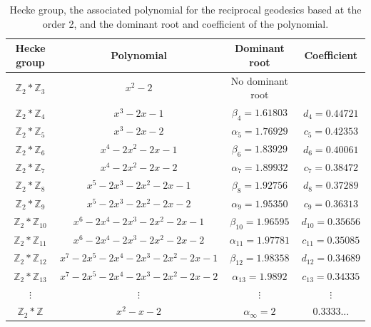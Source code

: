 \documentclass[11pt]{amsart}
\numberwithin{equation}{section}
\theoremstyle{plain}
\begin{document}
\begin{table}\label{ta: poly}
\begin{center}
\begin{tabular}{ |c|c|c|c| } 
 \hline
 Hecke group & Polynomial & Dominant root & Coefficient   \\ 
\hline
\hline
 $\mathbb{Z}_2\ast \mathbb{Z}_3$&$x^{2}-2$ & No dominant root& \\ 
\hline
 $\mathbb{Z}_2\ast \mathbb{Z}_4$&  $x^{3}-2x-1$& $\beta_{4}=1.61803$  & $d_{4}=0.44721$  \\ 
\hline
 $\mathbb{Z}_2\ast \mathbb{Z}_5$&$x^{3}-2x-2$&$\alpha_{5}=1.76929$ & $c_{5}=0.42353$  \\
\hline
 $\mathbb{Z}_2\ast \mathbb{Z}_6$&$x^{4}-2x^{2}-2x-1$ &$\beta_{6}=1.83929$  & $d_{6}=0.40061$  \\
\hline
 $\mathbb{Z}_2\ast \mathbb{Z}_7$&$x^{4}-2x^{2}-2x-2$& $\alpha_{7}=1.89932$ & $c_{7}=0.38472$  \\
\hline
 $\mathbb{Z}_2\ast \mathbb{Z}_8$&$x^{5}-2x^{3}-2x^{2}-2x-1$ &$\beta_{8}=1.92756$ & $d_{8}=0.37289$  \\
\hline
 $\mathbb{Z}_2\ast \mathbb{Z}_9$&$x^{5}-2x^{3}-2x^{2}-2x-2$ & $\alpha_9=1.95350$  & $c_{9}=0.36313$  \\
\hline 
 $\mathbb{Z}_2\ast \mathbb{Z}_{10}$&$x^{6}-2x^{4}-2x^{3}-2x^{2}-2x-1$&$\beta_{10}=1.96595$  & $d_{10}=0.35656$  \\
\hline
 $\mathbb{Z}_2\ast \mathbb{Z}_{11}$&$x^{6}-2x^{4}-2x^{3}-2x^{2}-2x-2$&$\alpha_{11}=1.97781$ & $c_{11}=0.35085$  \\
\hline 
 $\mathbb{Z}_2\ast \mathbb{Z}_{12}$&$x^{7}-2x^{5}-2x^{4}-2x^{3}-2x^{2}-2x-1$ &$\beta_{12}=1.98358$ & $d_{12}=0.34689$  \\
 \hline
  $\mathbb{Z}_2\ast \mathbb{Z}_{13}$&$x^{7}-2x^{5}-2x^{4}-2x^{3}-2x^{2}-2x-2$ &$\alpha_{13}=1.9892$ & $c_{13}=0.34335$  \\
 \hline
  $\vdots$ &$\vdots$ &$\vdots$ & $\vdots$  \\
 \hline
  $\mathbb{Z}_2\ast \mathbb{Z}$&$x^{2}-x-2$& $\alpha_{\infty}=2$ & 0.3333...\\
 \hline
\end{tabular}
\end{center}
\caption{Hecke group, the associated polynomial for the reciprocal geodesics based at the order 2, and the  dominant root and coefficient of the polynomial.} 
\end{table}
\end{document}
